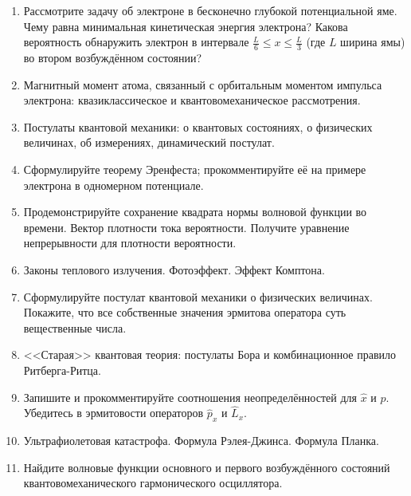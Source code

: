 \documentclass[12pt]{article}
\newcommand{\kL}[1]{\label{К-#1}}
\def\twodigits#1{%
\ifnum#1<10 0\fi 
\number#1}
\begin{document}
\begin{enumerate}[label={\textbf{К-\protect\twodigits{\theenumi}}}]
\item\kL{23}
Рассмотрите задачу об электроне в бесконечно глубокой потенциальной яме. Чему равна минимальная кинетическая энергия электрона? Какова вероятность обнаружить электрон в интервале $\frac{L}{6}\le x\le\frac{L}{3}$ (где $L$ ширина ямы) во втором возбуждённом состоянии?

\item\kL{24}
Магнитный момент атома, связанный с орбитальным моментом импульса электрона: квазиклассическое и квантовомеханическое рассмотрения.

\item\kL{25}
Постулаты квантовой механики: о квантовых состояниях, о физических величинах, об измерениях, динамический постулат.

\item\kL{26}
Сформулируйте теорему Эренфеста; прокомментируйте её на примере электрона в одномерном потенциале.

\item\kL{27}
Продемонстрируйте сохранение квадрата нормы волновой функции во времени. Вектор плотности тока вероятности. Получите уравнение непрерывности для плотности вероятности.

\item\kL{28}
Законы теплового излучения. Фотоэффект. Эффект Комптона.

\item\kL{29}
Сформулируйте постулат квантовой механики о физических величинах. Покажите, что все собственные значения эрмитова оператора суть вещественные числа.

\item\kL{30}
<<Старая>> квантовая теория: постулаты Бора и комбинационное правило Ритберга-Ритца.

\item\kL{31}
Запишите и прокомментируйте соотношения неопределённостей для $\hat{x}$ и $\hat{p}$. Убедитесь в эрмитовости операторов $\hat{p}_x$ и $\hat{L}_x$.

\item\kL{32}
Ультрафиолетовая катастрофа. Формула Рэлея-Джинса. Формула Планка.

\item\kL{33}
Найдите волновые функции основного и первого возбуждённого состояний квантовомеханического гармонического осциллятора.

\end{enumerate}
\end{document}
